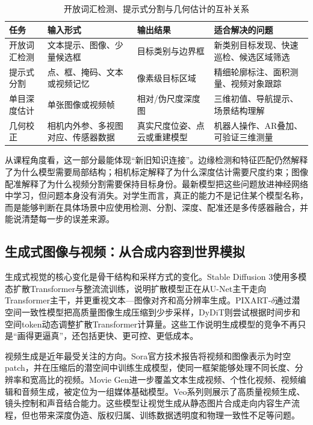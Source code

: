 \documentclass[UTF8,a4paper,12pt]{ctexart}
\newcommand{\model}[1]{\textsf{#1}}
\begin{document}
\begin{table}[htbp]
\centering
\small
\caption{开放词汇检测、提示式分割与几何估计的互补关系}
\begin{tabularx}{\textwidth}{C{2.4cm}Y Y Y}
\toprule
\textbf{任务} & \textbf{输入形式} & \textbf{输出结果} & \textbf{适合解决的问题} \\
\midrule
开放词汇检测 & 文本提示、图像、少量候选框 & 目标类别与边界框 & 新类别目标发现、快速巡检、候选区域筛选 \\
提示式分割 & 点、框、掩码、文本或视频记忆 & 像素级目标区域 & 精细轮廓标注、面积测量、视频对象跟踪 \\
单目深度估计 & 单张图像或视频帧 & 相对/伪尺度深度图 & 三维初值、导航提示、场景结构理解 \\
几何校正 & 相机内外参、多视图对应、传感器数据 & 真实尺度位姿、点云或重建模型 & 机器人操作、AR叠加、可验证三维测量 \\
\bottomrule
\end{tabularx}
\end{table}

从课程角度看，这一部分最能体现“新旧知识连接”。边缘检测和特征匹配仍然解释了为什么模型需要局部结构；相机标定解释了为什么深度估计需要尺度约束；图像配准解释了为什么视频分割需要保持目标身份。最新模型把这些问题放进神经网络中学习，但问题本身没有消失。对学生而言，真正的能力不是记住某个模型名称，而是能够判断在具体场景中应使用检测、分割、深度、配准还是多传感器融合，并能说清楚每一步的误差来源。

\subsection{生成式图像与视频：从合成内容到世界模拟}
生成式视觉的核心变化是骨干结构和采样方式的变化。\model{Stable Diffusion 3}使用多模态扩散Transformer与整流流训练，说明扩散模型正在从U-Net主干走向Transformer主干，并更重视文本—图像对齐和高分辨率生成\cite{sd3}。\model{PIXART-$\delta$}通过潜空间一致性模型把高质量图像生成压缩到少步采样\cite{pixartdelta}，\model{DyDiT}则尝试根据时间步和空间token动态调整扩散Transformer计算量\cite{dydit}。这些工作说明生成模型的竞争不再只是“画得更逼真”，还包括更快、更可控、更低成本。

视频生成是近年最受关注的方向。\model{Sora}官方技术报告将视频和图像表示为时空patch，并在压缩后的潜空间中训练生成模型，使同一框架能够处理不同长度、分辨率和宽高比的视频\cite{sora}。\model{Movie Gen}进一步覆盖文本生成视频、个性化视频、视频编辑和音频生成，被定位为一组媒体基础模型\cite{moviegen}。\model{Veo}系列则展示了高质量视频生成、镜头控制和声音结合能力\cite{veo}。这些模型让视觉生成从静态图片合成走向内容生产流程，但也带来深度伪造、版权归属、训练数据透明度和物理一致性不足等问题。
\end{document}
